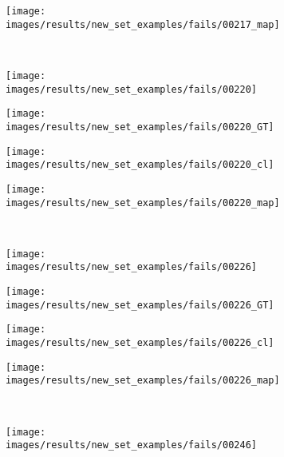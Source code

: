 \begin{figure}[t]
\begin{subfigure}[c]{0.24\textwidth}
 \end{subfigure}
 \begin{subfigure}[c]{0.24\textwidth}
  \centering
  \texttt{[image: images/results/new\_set\_examples/fails/00217\_map]}
 \end{subfigure}
 \\
 \begin{subfigure}[c]{0.24\textwidth}
  \centering
  \texttt{[image: images/results/new\_set\_examples/fails/00220]}
 \end{subfigure}
 \begin{subfigure}[c]{0.24\textwidth}
  \centering
  \texttt{[image: images/results/new\_set\_examples/fails/00220\_GT]}
 \end{subfigure}
 \begin{subfigure}[c]{0.24\textwidth}
  \centering
  \texttt{[image: images/results/new\_set\_examples/fails/00220\_cl]}
 \end{subfigure}
 \begin{subfigure}[c]{0.24\textwidth}
  \centering
  \texttt{[image: images/results/new\_set\_examples/fails/00220\_map]}
 \end{subfigure}
 \\
 \begin{subfigure}[c]{0.24\textwidth}
  \centering
  \texttt{[image: images/results/new\_set\_examples/fails/00226]}
 \end{subfigure}
 \begin{subfigure}[c]{0.24\textwidth}
  \centering
  \texttt{[image: images/results/new\_set\_examples/fails/00226\_GT]}
 \end{subfigure}
 \begin{subfigure}[c]{0.24\textwidth}
  \centering
  \texttt{[image: images/results/new\_set\_examples/fails/00226\_cl]}
 \end{subfigure}
 \begin{subfigure}[c]{0.24\textwidth}
  \centering
  \texttt{[image: images/results/new\_set\_examples/fails/00226\_map]}
 \end{subfigure}
 \\
 \begin{subfigure}[c]{0.24\textwidth}
  \centering
  \texttt{[image: images/results/new\_set\_examples/fails/00246]}
 \end{subfigure}
 \begin{subfigure}[c]{0.24\textwidth}
  \centering

\end{subfigure}
\end{figure}
